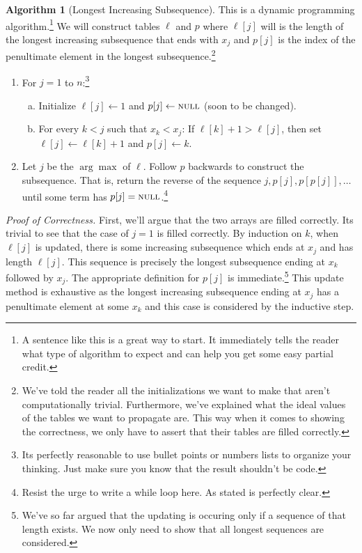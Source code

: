 \documentclass[10pt]{article}
\theoremstyle{plain}
\theoremstyle{definition}
\newtheorem{alg}[thm]{Algorithm}
\newcommand{\short}[1]{\mbox{\sc #1}}
\newcommand{\nil}{\short{null}}
\numberwithin{equation}{section}
\numberwithin{figure}{section}
\begin{document}
\begin{alg}[Longest Increasing Subsequence] This is a dynamic programming algorithm.\footnote{A sentence like this is a great way to start. It immediately tells the reader what type of algorithm to expect and can help you get some easy partial credit.} We will construct tables $\ell$ and $p$ where $\ell[j]$ will is the length of the longest increasing subsequence that ends with $x_j$ and $p[j]$ is the index of the penultimate element in the longest subsequence.\footnote{We've told the reader all the initializations we want to make that aren't computationally trivial. Furthermore, we've explained what the ideal values of the tables we want to propagate are. This way when it comes to showing the correctness, we only have to assert that their tables are filled correctly.} 

\begin{enumerate}
\item For $j = 1$ to $n$:\footnote{Its perfectly reasonable to use bullet points or numbers lists to organize your thinking. Just make sure you know that the result shouldn't be code.}
\begin{enumerate}[(a)]
\item Initialize $\ell[j] \leftarrow 1$ and $p[j] \leftarrow \nil$ (soon to be changed).
\item For every $k < j$ such that $x_k < x_j$: If $\ell[k] + 1 > \ell[j]$, then set $\ell[j] \leftarrow \ell[k] + 1$ and $p[j] \leftarrow k$.
\end{enumerate}
\item Let $j$ be the $\arg \max$ of $\ell$. Follow $p$ backwards to construct the subsequence. That is, return the reverse of the sequence $j, p[j], p[p[j]], \ldots$ until some term has $p[j] = \nil$.\footnote{Resist the urge to write a while loop here. As stated is perfectly clear.}
\end{enumerate}

\noindent \textit{Proof of Correctness.} First, we'll argue that the two arrays are filled correctly. Its trivial to see that the case of $j = 1$ is filled correctly. By induction on $k$, when $\ell[j]$ is updated, there is some increasing subsequence which ends at $x_j$ and has length $\ell[j]$. This sequence is precisely the longest subsequence ending at $x_k$ followed by $x_j$. The appropriate definition for $p[j]$ is immediate.\footnote{We've so far argued that the updating is occuring only if a sequence of that length exists. We now only need to show that all longest sequences are considered.} This update method is exhaustive as the longest increasing subsequence ending at $x_j$ has a penultimate element at some $x_k$ and this case is considered by the inductive step. \\


\end{alg}
\end{document}
